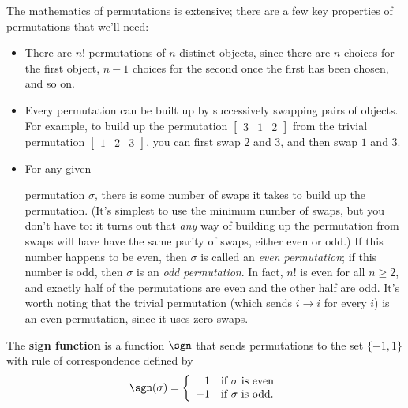 The mathematics of permutations is extensive; there are a few key properties of permutations that we'll need:

\begin{itemize}
\item There are $n!$ permutations of $n$ distinct objects, since there are $n$ choices for the first object, $n-1$ choices for the second once the first has been chosen, and so on.

\item Every permutation can be built up by successively swapping pairs of objects.  For example, to build up the permutation $\begin{bmatrix} 3 & 1 & 2 \end{bmatrix}$ from the trivial permutation $\begin{bmatrix} 1 & 2 & 3 \end{bmatrix}$, you can first swap $2$ and $3$, and then swap $1$ and $3$.

\item \hypertarget{permutation_parity}{For any given} permutation $\sigma$, there is some number of swaps it takes to build up the permutation.  (It's simplest to use the minimum number of swaps, but you don't have to: it turns out that \emph{any} way of building up the permutation from swaps will have have the same parity of swaps, either even or odd.) 
If this number happens to be even, then $\sigma$ is called an \emph{even permutation}; if this number is odd, then $\sigma$ is an \emph{odd permutation}.  In fact, $n!$ is even for all $n\geq 2$, and exactly half of the permutations are even and the other half are odd.  It's worth noting that the trivial permutation (which sends $i\rightarrow i$ for every $i$) is an even permutation, since it uses zero swaps.
\end{itemize}

\begin{definition}
The {\bfseries sign function} is a function $\sgn $ that sends permutations to the set $\{-1,1\}$ with rule of correspondence defined by
\[ \sgn (\sigma) = 
\left\{ \begin{array}{rl}
1 & \mbox{if $\sigma$ is even}\\
-1 & \mbox{if $\sigma$ is odd}.\end{array} \right.
\]
\end{definition}


